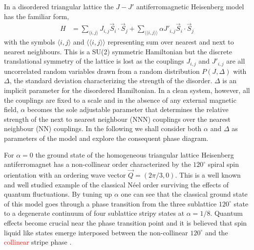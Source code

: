 \documentclass[aps,prb,twocolumn,showpacs]{revtex4-1}
\newcommand{\rcol}{\textcolor{red}}
\newcommand{\beq}{\begin{equation}}
\newcommand{\eeq}{\end{equation}}
\newcommand{\bal}{\begin{aligned}}
\newcommand{\eal}{\end{aligned}}
\newcommand{\bra}{\langle}
\newcommand{\ket}{\rangle}
\newcommand{\vS}{\vec{S}}
\newcommand{\vQ}{\vec{Q}}
\begin{document}
In a disordered triangular lattice the $J-J'$ antiferromagnetic Heisenberg model
has the familiar form,
\beq\label{eq:main_ham}
    \bal
        H &= \sum_{\bra i,j \ket} J_{i,j}\vS_i\cdot\vS_j 
        + \sum_{\bra\bra i,j \ket\ket}\alpha J'_{i,j}\vS_i\cdot\vS_j    
    \eal
\eeq
with the symbols $\bra i,j\ket$ and $\bra\bra i,j\ket\ket$ representing sum over
nearest and next to nearest neighbours. This is a SU(2) symmetric Hamiltonian
but the discrete translational symmetry of the lattice is lost as the couplings
$J_{i,j}$ and $J'_{i,j}$ are all uncorrelated random variables 
drawn from a random distribution $P(J,\Delta)$ with $\Delta$, the standard deviation 
characterizing the strength of the disorder. $\Delta$ is an implicit parameter for 
the disordered Hamiltonian. In a clean system, however, all the couplings are fixed 
to a scale and in the absence of any external magnetic field, $\alpha$ becomes the 
sole adjustable parameter that determines the relative strength of the next to nearest 
neighbour (NNN) couplings over the nearest neighbour (NN) couplings. In the following 
we shall consider both $\alpha$ and $\Delta$ as parameters of the model and explore 
the consequent phase diagram.

For $\alpha=0$ the ground state of the homogeneous triangular lattice Heisenberg 
antiferromagnet has a non-collinear order characterized by the $120^{\circ}$ spiral
spin orientation with an ordering wave vector $\vQ=(2\pi/3,0)$. This is a well known
and well studied example of the classical N\'eel order surviving the effects of 
quantum fluctuations\cite{Jolicoeur-NN-triangular-1989,*Huse-NN-triangular-1988,
*Nishimori-NN-triangular-1985}. By tuning up $\alpha$ one can see that the classical 
ground state of this model goes through a phase transition from the three sublattice 
$120^\circ$ state to a degenerate continuum of four sublattice stripy states at 
$\alpha=1/8$\cite{Jolicoeur-NNN-triangular-1990,Kaneko-NNN-triangular-2014}. Quantum 
effects become crucial near the phase transition point and it is believed that 
spin liquid like states emerge interposed between the non-collinear $120^\circ$ and 
the \rcol{collinear} stripe phase
\cite{Hu-NNN-triangular-2015,Kaneko-NNN-triangular-2014}.
\end{document}
